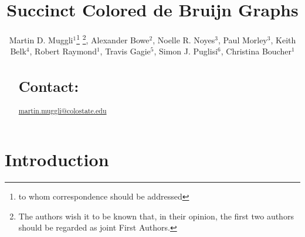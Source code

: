 \documentclass{bioinfo}
\begin{document}

\title[Succinct Colored de Bruijn Graphs]{Succinct Colored de Bruijn Graphs}

\author[Muggli, et al.]{Martin D. Muggli$^{1}$\footnote{to whom correspondence should be addressed} \footnote{The authors wish it to be known that, in their opinion, the first two authors should be regarded as joint First Authors.}, 
  Alexander Bowe$^{2}$\footnotemark[2],
  Noelle R. Noyes$^{3}$,
Paul Morley$^{3}$,
Keith Belk$^{4}$,
Robert Raymond$^{1}$,
Travis Gagie$^{5}$, 
Simon J. Puglisi$^{6}$,
Christina Boucher$^{1}$}

\address{$^{1}$Department of Computer Science, Colorado State University, Fort Collins, CO\\
  $^{2}$National Institute of Informatics, Chiyoda-ku, Tokyo, Japan\\
    $^{3}$Department of Clinical Sciences, Colorado State University, Fort Collins, CO\\
  $^{4}$Department of Animal Sciences, Colorado State University, Fort Collins, CO\\
  $^{5}$School of Computer Science and Telecommunications, Diego Portales University, Santiago, Chile\\
  $^{6}$Department of Computer Science, University of Helsinki, Finland}



\maketitle

\begin{abstract}
  
  

\section{Contact:} \href{martin.muggli@colostate.edu}{martin.muggli@colostate.edu}
\end{abstract}

\section{Introduction}\label{sec:introduction}

\end{document}
